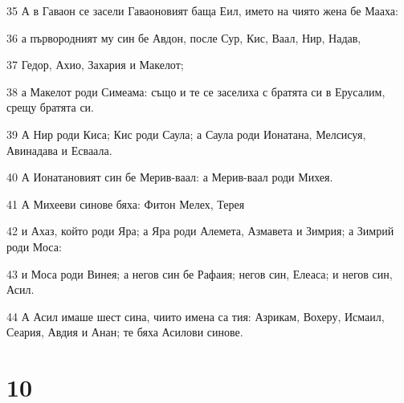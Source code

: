 \par 35 А в Гаваон се засели Гаваоновият баща Еил, името на чиято жена бе Мааха:
\par 36 а първородният му син бе Авдон, после Сур, Кис, Ваал, Нир, Надав,
\par 37 Гедор, Ахио, Захария и Макелот;
\par 38 а Макелот роди Симеама: също и те се заселиха с братята си в Ерусалим, срещу братята си.
\par 39 А Нир роди Киса; Кис роди Саула; а Саула роди Ионатана, Мелсисуя, Авинадава и Есваала.
\par 40 А Ионатановият син бе Мерив-ваал: а Мерив-ваал роди Михея.
\par 41 А Михееви синове бяха: Фитон Мелех, Терея
\par 42 и Ахаз, който роди Яра; а Яра роди Алемета, Азмавета и Зимрия; а Зимрий роди Моса:
\par 43 и Моса роди Винея; а негов син бе Рафаия; негов син, Елеаса; и негов син, Асил.
\par 44 А Асил имаше шест сина, чиито имена са тия: Азрикам, Вохеру, Исмаил, Сеария, Авдия и Анан; те бяха Асилови синове.

\chapter{10}

